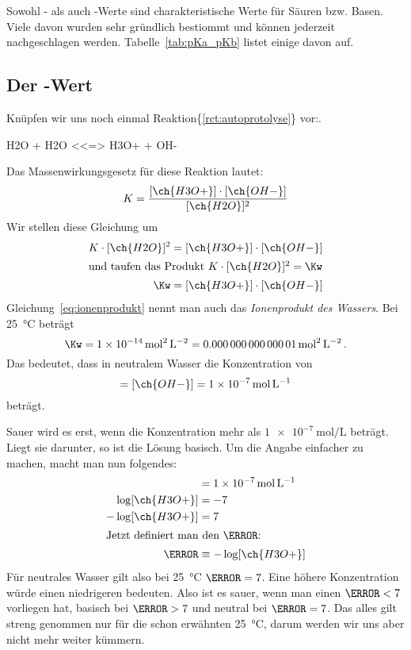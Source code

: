 \documentclass{arbeitsblatt}
\newcommand*\rctref[1]{\{\ref{#1}\}}
\begin{document}
Sowohl \pKa- als auch \pKb-Werte sind charakteristische Werte für Säuren
bzw. Basen.  Viele davon wurden sehr gründlich bestiommt und können jederzeit
nachgeschlagen werden.  Tabelle~\ref{tab:pKa_pKb} listet einige davon auf.

\subsection{Der \pH-Wert}
Knüpfen wir uns noch einmal Reaktion\rctref{rct:autoprotolyse} vor:.
\begin{reaction*}
  H2O + H2O <<=> H3O+ + OH-
\end{reaction*}
Das Massenwirkungsgesetz für diese Reaktion lautet:
\begin{equation}
  K = \frac{ [\ch{H3O+}] \cdot [\ch{OH-}] }{ [\ch{H2O}]^2 }
\end{equation}
Wir stellen diese Gleichung um
\begin{align}
  K \cdot [\ch{H2O}]^2  &= [\ch{H3O+}] \cdot [\ch{OH-}] \\
  \intertext{und taufen das Produkt \(K \cdot [\ch{H2O}]^2 = \Kw\)}
  \Kw  &= [\ch{H3O+}] \cdot [\ch{OH-}] \label{eq:ionenprodukt}
\end{align}
Gleichung~\eqref{eq:ionenprodukt} nennt man auch das \emph{Ionenprodukt des
  Wassers}.  Bei \SI{25}{\celsius} beträgt
\[
  \Kw = \SI{1e-14}{\mole\squared\per\liter\squared}
      = \SI{0.00000000000001}{\mole\squared\per\liter\squared} \,.
\]
Das bedeutet, dass in neutralem Wasser die Konzentration von 
\begin{equation}
  [\ch{H3O+}] = [\ch{OH-}] = \SI{1e-7}{\mole\per\liter}
\end{equation}
beträgt.

Sauer wird es erst, wenn die Konzentration mehr als $\SI{1e-7}{\mole\per\liter}$
beträgt.  Liegt sie darunter, so ist die Lösung basisch.  Um die Angabe
einfacher zu machen, macht man nun folgendes:
\begin{align}
  [\ch{H3O+}]      &= \SI{1e-7}{\mole\per\liter} \\
  \log[\ch{H3O+}]  &= -7 \\
  -\log[\ch{H3O+}] &= 7 \\
  \intertext{Jetzt definiert man den \pH:}
  \pH &\equiv -\log[\ch{H3O+}] \label{eq:pH_definition}
\end{align}
Für neutrales Wasser gilt also bei \SI{25}{\celsius} $\pH = 7$.  Eine höhere
Konzentration würde einen niedrigeren \pH bedeuten.  Also ist es sauer, wenn
man einen $\pH < 7$ vorliegen hat, basisch bei $\pH > 7$ und neutral bei $\pH
= 7$.  Das alles gilt streng genommen nur für die schon erwähnten
\SI{25}{\celsius}, darum werden wir uns aber nicht mehr weiter kümmern.
\end{document}
